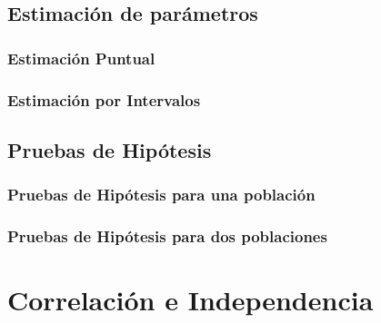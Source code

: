 \documentclass[a4paper, 12pt]{article}
\begin{document}
\subsection{Estimación de parámetros}

\subsubsection{Estimación Puntual}

\subsubsection{Estimación por Intervalos}

\subsection{Pruebas de Hipótesis}

\subsubsection{Pruebas de Hipótesis para una población}

\subsubsection{Pruebas de Hipótesis para dos poblaciones}

\newpage

\section{Correlación e Independencia}
\end{document}
